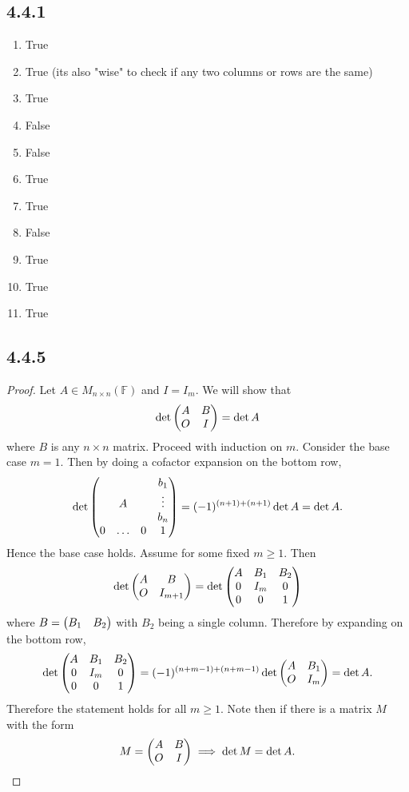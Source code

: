 \documentclass[12pt,titlepage]{extarticle}
\begin{document}
\subsection*{4.4.1}
\begin{enumerate}[label=\alph*)]
    \item True
    \item True (its also "wise" to check if any two columns or rows are the same)
    \item True
    \item False
    \item False
    \item True
    \item True
    \item False
    \item True
    \item True
    \item True
\end{enumerate}

\subsection*{4.4.5}
\begin{proof}
    Let $A \in M_{n\times n}(\mathbb{F})$ and $I = I_{m}$. We will show that
    \[
        \det\mqty(A & B \\ O & I) = \det A
    \]
    where $B$ is any $n\times n$ matrix. Proceed with induction on $m$. Consider the base case $m = 1$. Then by doing a cofactor expansion on the bottom row,
    \[
        \det\mqty(
          &   &   & b_1 \\
          & A &   & \vdots \\
          &   &   & b_n \\
        0 & \ldots & 0 & 1
        ) = (-1)^{(n+1) + (n+1)} \det A = \det A
    .\]
    Hence the base case holds. Assume for some fixed $m \geq 1$. Then
    \[
        \det\mqty(
            A & B \\
            O & I_{m+1}
        ) = \det\mqty(
            A & B_1 & B_2 \\
            0 & I_{m} & 0 \\
            0 & 0  & 1
        )
    \]
        where $B = \mqty(B_1 & B_2)$ with $B_2$ being a single column. Therefore by expanding on the bottom row,
        \[
        \det\mqty(
            A & B_1 & B_2 \\
            0 & I_{m} & 0 \\
            0 & 0  & 1
            ) = (-1)^{(n + m - 1) + (n + m - 1)} \det\mqty(A & B_1 \\ O & I_m) = \det A
        .\]
        Therefore the statement holds for all $m \geq 1$. Note then if there is a matrix $M$ with the form
        \[
            M = \mqty(A & B \\ O & I) \implies \det M = \det A 
        .\]
\end{proof}
\end{document}
